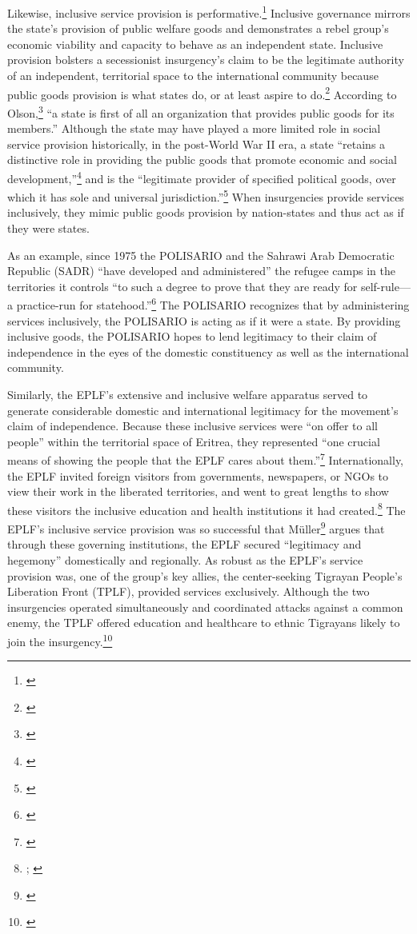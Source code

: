 \documentclass[12pt, letterpaper]{article}
\begin{document}
Likewise, inclusive service provision is performative.\footnote{\citealt{arjona2015rebel}} Inclusive governance mirrors the state's provision of public welfare goods and demonstrates a rebel group's economic viability and capacity to behave as an independent state. Inclusive provision bolsters a secessionist insurgency's claim to be the legitimate authority of an independent, territorial space to the international community because public goods provision is what states do, or at least aspire to do.\footnote{\citealt{krasner1999sovereignty, krasner2014external}} According to Olson,\footnote{\citealt[15]{olson1965logic}} ``a state is first of all an organization that provides public goods for its members.'' Although the state may have played a more limited role in social service provision historically, in the post-World War II era, a state ``retains a distinctive role in providing the public goods that promote economic and social development,''\footnote{\citealt[25]{world1997world}} and is the ``legitimate provider of specified political goods, over which it has sole and universal jurisdiction.''\footnote{\citealt{munro1996power}} When insurgencies provide services inclusively, they mimic public goods provision by nation-states and thus act as if they were states. 

As an example, since 1975 the POLISARIO and the Sahrawi Arab Democratic Republic (SADR) ``have developed and administered'' the refugee camps in the territories it controls ``to such a degree to prove that they are ready for self-rule---a practice-run for statehood.''\footnote{\citealt{sahrawi2010}} The POLISARIO recognizes that by administering services inclusively, the POLISARIO is acting as if it were a state. By providing inclusive goods, the POLISARIO hopes to lend legitimacy to their claim of independence in the eyes of the domestic constituency as well as the international community.

Similarly, the EPLF's extensive and inclusive welfare apparatus served to generate considerable domestic and international legitimacy for the movement's claim of independence. Because these inclusive services were ``on offer to all people'' within the territorial space of Eritrea, they represented ``one crucial means of showing the people that the EPLF cares about them.''\footnote{\citealt[99]{cliffe1998comparative}} Internationally, the EPLF invited foreign visitors from governments, newspapers, or NGOs to view their work in the liberated territories, and went to great lengths to show these visitors the inclusive education and health institutions it had created.\footnote{\citealt{firebrace1985never}; \citealt[103, 200]{selected82}} The EPLF's inclusive service provision was so successful that M\"uller\footnote{\citealt[795]{muller2012rebel}} argues that through these governing institutions, the EPLF secured ``legitimacy and hegemony'' domestically and regionally. As robust as the EPLF's service provision was, one of the group's key allies, the center-seeking Tigrayan People's Liberation Front (TPLF), provided services exclusively. Although the two insurgencies operated simultaneously and coordinated attacks against a common enemy, the TPLF offered education and healthcare to ethnic Tigrayans likely to join the insurgency.\footnote{\citealt[99, 173]{young2006peasant}}
\end{document}
